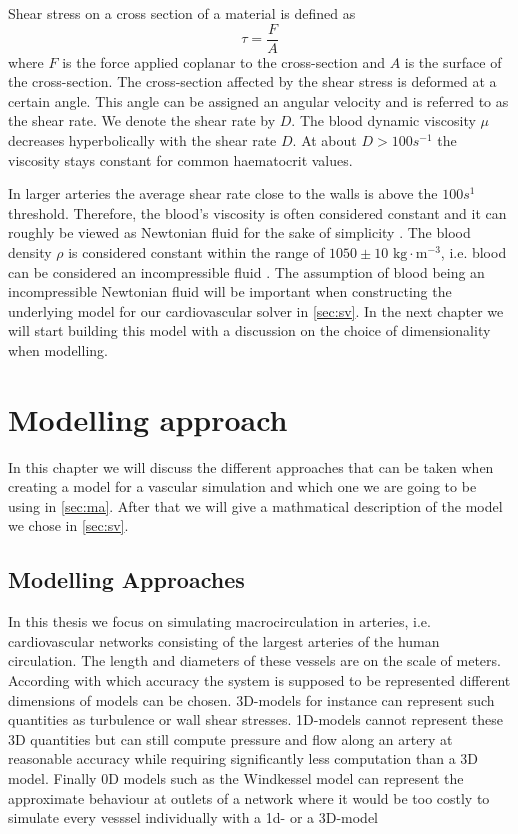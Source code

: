 \documentclass[a4paper, oneside]{discothesis}
\begin{document}
Shear stress on a cross section of a material is defined as 
\begin{equation}
	\tau = \frac{F}{A}
\end{equation}
where $F$ is the force applied coplanar to the cross-section and $A$ is the surface of the cross-section.
The cross-section affected by the shear stress is deformed at a certain angle. 
This angle can be assigned an angular velocity and is referred to as the shear rate.
We denote the shear rate by $D$. \cite{köppl2023dimension}
The blood dynamic viscosity $\mu$ decreases hyperbolically with the shear rate $D$.
At about $D > 100s^{-1}$ the viscosity stays constant for common haematocrit values.

In larger arteries the average shear rate close to the walls is above the $100s^1$ threshold. \cite{MCDbook}
Therefore, the blood's viscosity is often considered constant and it can roughly be viewed as Newtonian fluid for the sake of simplicity \cite{fung1996biomechanics,guyton2006textbook,MCDbook,pedley_1980,zamir2000physics,zamir2006physics}. 
The blood density $\rho$ is considered constant within the range of $1050 \pm 10 \text{ kg}\cdot\text{m}^{-3}$, i.e. blood can be considered an incompressible fluid \cite{PMID:2658951,kenner1977continuous,helmig1997multiphase}.
The assumption of blood being an incompressible Newtonian fluid will be important when constructing the underlying model for our cardiovascular solver in \autoref{sec:sv}. In the next chapter we will start building this model with a discussion on the choice of dimensionality when modelling.

\chapter{Modelling approach} \label{chap:1dm}
In this chapter we will discuss the different approaches that can be taken when creating a model for a vascular simulation and which one we are going to be using in \autoref{sec:ma}.
After that we will give a mathmatical description of the model we chose in \autoref{sec:sv}.

\section{Modelling Approaches} \label{sec:ma}
In this thesis we focus on simulating macrocirculation in arteries, i.e. cardiovascular networks consisting of the largest arteries of the human circulation.
The length and diameters of these vessels are on the scale of meters.
According with which accuracy the system is supposed to be represented different dimensions of models can be chosen.
3D-models for instance can represent such quantities as turbulence or wall shear stresses.
1D-models cannot represent these 3D quantities but can still compute pressure and flow along an artery at reasonable accuracy while requiring significantly less computation than a 3D model.
Finally 0D models such as the Windkessel model can represent the approximate behaviour at outlets of a network where it would be too costly to simulate every vesssel individually with a 1d- or a 3D-model
\end{document}
